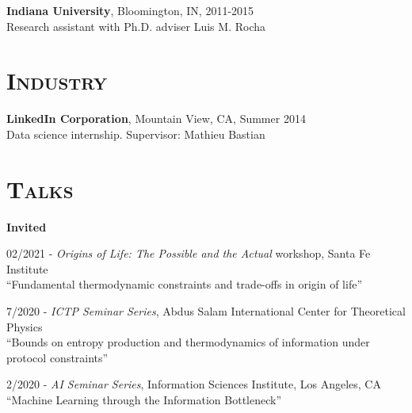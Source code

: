 \documentclass[margin,line,centered]{res}
\begin{document}
\begin{resume}
\textbf{Indiana University}, Bloomington, IN, 2011-2015\\
Research assistant with Ph.D. adviser Luis M. Rocha 

\section{\textsc{Industry}}

\textbf{LinkedIn Corporation}, Mountain View, CA, Summer 2014\\
Data science internship. Supervisor: Mathieu Bastian



\section{\textsc{Talks}}

\textbf{Invited}

02/2021 - \emph{Origins of Life: The Possible and the Actual} workshop, Santa Fe Institute\\
``Fundamental thermodynamic constraints and trade-offs in origin of life'' %


7/2020 - \emph{ICTP Seminar Series}, Abdus Salam International Center for Theoretical Physics\\
``Bounds on entropy production and thermodynamics of information under protocol constraints'' %


2/2020 - \emph{AI Seminar Series}, Information Sciences Institute, Los Angeles, CA\\
``Machine Learning through the Information Bottleneck'' %


\end{resume}
\end{document}
